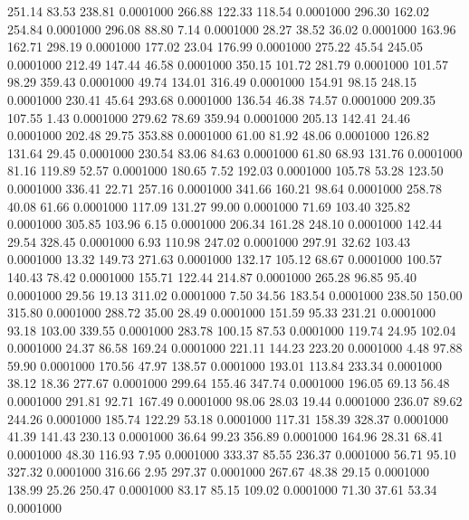  251.14   83.53  238.81   0.0001000
 266.88  122.33  118.54   0.0001000
 296.30  162.02  254.84   0.0001000
 296.08   88.80    7.14   0.0001000
  28.27   38.52   36.02   0.0001000
 163.96  162.71  298.19   0.0001000
 177.02   23.04  176.99   0.0001000
 275.22   45.54  245.05   0.0001000
 212.49  147.44   46.58   0.0001000
 350.15  101.72  281.79   0.0001000
 101.57   98.29  359.43   0.0001000
  49.74  134.01  316.49   0.0001000
 154.91   98.15  248.15   0.0001000
 230.41   45.64  293.68   0.0001000
 136.54   46.38   74.57   0.0001000
 209.35  107.55    1.43   0.0001000
 279.62   78.69  359.94   0.0001000
 205.13  142.41   24.46   0.0001000
 202.48   29.75  353.88   0.0001000
  61.00   81.92   48.06   0.0001000
 126.82  131.64   29.45   0.0001000
 230.54   83.06   84.63   0.0001000
  61.80   68.93  131.76   0.0001000
  81.16  119.89   52.57   0.0001000
 180.65    7.52  192.03   0.0001000
 105.78   53.28  123.50   0.0001000
 336.41   22.71  257.16   0.0001000
 341.66  160.21   98.64   0.0001000
 258.78   40.08   61.66   0.0001000
 117.09  131.27   99.00   0.0001000
  71.69  103.40  325.82   0.0001000
 305.85  103.96    6.15   0.0001000
 206.34  161.28  248.10   0.0001000
 142.44   29.54  328.45   0.0001000
   6.93  110.98  247.02   0.0001000
 297.91   32.62  103.43   0.0001000
  13.32  149.73  271.63   0.0001000
 132.17  105.12   68.67   0.0001000
 100.57  140.43   78.42   0.0001000
 155.71  122.44  214.87   0.0001000
 265.28   96.85   95.40   0.0001000
  29.56   19.13  311.02   0.0001000
   7.50   34.56  183.54   0.0001000
 238.50  150.00  315.80   0.0001000
 288.72   35.00   28.49   0.0001000
 151.59   95.33  231.21   0.0001000
  93.18  103.00  339.55   0.0001000
 283.78  100.15   87.53   0.0001000
 119.74   24.95  102.04   0.0001000
  24.37   86.58  169.24   0.0001000
 221.11  144.23  223.20   0.0001000
   4.48   97.88   59.90   0.0001000
 170.56   47.97  138.57   0.0001000
 193.01  113.84  233.34   0.0001000
  38.12   18.36  277.67   0.0001000
 299.64  155.46  347.74   0.0001000
 196.05   69.13   56.48   0.0001000
 291.81   92.71  167.49   0.0001000
  98.06   28.03   19.44   0.0001000
 236.07   89.62  244.26   0.0001000
 185.74  122.29   53.18   0.0001000
 117.31  158.39  328.37   0.0001000
  41.39  141.43  230.13   0.0001000
  36.64   99.23  356.89   0.0001000
 164.96   28.31   68.41   0.0001000
  48.30  116.93    7.95   0.0001000
 333.37   85.55  236.37   0.0001000
  56.71   95.10  327.32   0.0001000
 316.66    2.95  297.37   0.0001000
 267.67   48.38   29.15   0.0001000
 138.99   25.26  250.47   0.0001000
  83.17   85.15  109.02   0.0001000
  71.30   37.61   53.34   0.0001000
